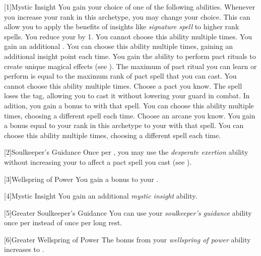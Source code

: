         [1]{Mystic Insight}
        You gain your choice of one of the following abilities.
        Whenever you increase your rank in this archetype, you may change your choice.
        This can allow you to apply the benefits of insights like \textit{signature spell} to higher rank spells.
        {
             You reduce your  by 1.
                You cannot choose this ability multiple times.
             You gain an additional .
                You can choose this ability multiple times, gaining an additional insight point each time.
             You gain the ability to perform pact rituals to create unique magical effects (see ).
                The maximum  of pact ritual you can learn or perform is equal to the maximum rank of pact spell that you can cast.
                You cannot choose this ability multiple times.
             Choose a pact  you know.
                The spell loses the  tag, allowing you to cast it without lowering your guard in combat.
                In adition, you gain a  bonus to  with that spell.
                You can choose this ability multiple times, choosing a different spell each time.
             Choose an arcane  you know.
                You gain a bonus equal to your rank in this archetype to your  with that spell.
                You can choose this ability multiple times, choosing a different spell each time.
        }

        [2]{Soulkeeper's Guidance} Once per , you may use the \textit{desperate exertion} ability without increasing your  to affect a pact spell you cast (see ).

        [3]{Wellspring of Power}
        You gain a  bonus to your  .

        [4]{Mystic Insight}
        You gain an additional \textit{mystic insight} ability.

        [5]{Greater Soulkeeper's Guidance} You can use your \textit{soulkeeper's guidance} ability once per  instead of once per long rest.

        [6]{Greater Wellspring of Power}
        The bonus from your \textit{wellspring of power} ability increases to .


